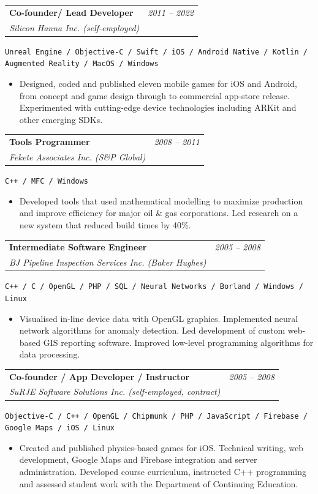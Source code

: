 \documentclass[10pt]{article}
\makeatletter
\newcommand{\experience}[4]{%
  \vspace{4pt}
  \begin{tabular*}{\textwidth}{@{}l@{\extracolsep{\fill}}r@{}}
    \textbf{#1} & \textit{#2} \\
    \textit{\small#3} & \textit{\small#4}
  \end{tabular*}
  \vspace{-4pt}
}
\makeatother
\begin{document}
\experience{Co-founder/ Lead Developer}{2011 -- 2022}{Silicon Hanna Inc. (self-employed)}{}
\hspace{0.5cm}\texttt{Unreal Engine / Objective-C / Swift / iOS / Android Native / Kotlin / Augmented Reality / MacOS / Windows}
\begin{itemize}
    \item Designed, coded and published eleven mobile games for iOS and Android, from concept and game design through to commercial app-store release. Experimented with cutting-edge device technologies including ARKit and other emerging SDKs.
\end{itemize}

\experience{Tools Programmer}{2008 -- 2011}{Fekete Associates Inc. (S\&P Global)}{}
\hspace{0.5cm}\texttt{C++ / MFC / Windows}
\begin{itemize}
    \item Developed tools that used mathematical modelling to maximize production and improve efficiency for major oil \& gas corporations. Led research on a new system that reduced build times by 40\%.
\end{itemize}

\experience{Intermediate Software Engineer}{2005 -- 2008}{BJ Pipeline Inspection Services Inc. (Baker Hughes)}{}
\hspace{0.5cm}\texttt{C++ / C / OpenGL / PHP / SQL / Neural Networks / Borland / Windows / Linux}
\begin{itemize}
    \item Visualised in-line device data with OpenGL graphics. Implemented neural network algorithms for anomaly detection. Led development of custom web-based GIS reporting software. Improved low-level programming algorithms for data processing.
\end{itemize}

\experience{Co-founder / App Developer / Instructor}{2005 -- 2008}{SuRJE Software Solutions Inc. (self-employed, contract)}{}
\hspace{0.5cm}\texttt{Objective-C / C++ / OpenGL / Chipmunk / PHP / JavaScript / Firebase / Google Maps / iOS / Linux}
\begin{itemize}
    \item Created and published physics-based games for iOS. Technical writing, web development, Google Maps and Firebase integration and server administration. Developed course curriculum, instructed C++ programming and assessed student work with the Department of Continuing Education.
\end{itemize}
\end{document}
